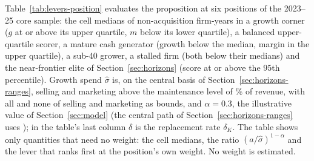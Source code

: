 Table~\ref{tab:levers-position} evaluates the proposition at six positions of the 2023--25 core sample: the cell medians of non-acquisition firm-years in a growth corner ($g$ at or above its upper quartile, $m$ below its lower quartile), a balanced upper-quartile scorer, a mature cash generator (growth below the median, margin in the upper quartile), a sub-40 grower, a stalled firm (both below their medians) and the near-frontier elite of Section~\ref{sec:horizons} (score at or above the 95th percentile). Growth spend $\hat\sigma$ is, on the central basis of Section~\ref{sec:horizons-ranges}, selling and marketing above the maintenance level of \lpMaintBase\% of revenue, with all and none of selling and marketing as bounds, and $\alpha=0.3$, the illustrative value of Section~\ref{sec:model} (the central path of Section~\ref{sec:horizons-ranges} uses \CenAlpha); in the table's last column $\delta$ is the replacement rate $\delta_K$. The table shows only quantities that need no weight: the cell medians, the ratio $(a/\hat\sigma)^{1-\alpha}$ and the lever that ranks first at the position's own weight. No weight is estimated.


